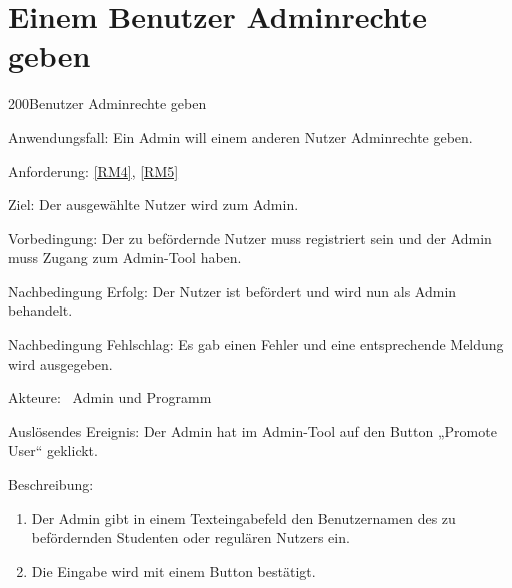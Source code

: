 \section{Einem Benutzer Adminrechte geben}
\begin{function}{200}{Benutzer Adminrechte geben}
\item[Anwendungsfall:] Ein Admin will einem anderen Nutzer Adminrechte geben.
\item[Anforderung:] \ref{RM4}, \ref{RM5}
\item[Ziel:] Der ausgewählte Nutzer wird zum Admin.
\item[Vorbedingung:] Der zu befördernde Nutzer muss registriert sein und der Admin muss Zugang zum Admin-Tool haben.
\item[Nachbedingung Erfolg:]  Der Nutzer ist befördert und wird nun als Admin behandelt.
\item[Nachbedingung Fehlschlag:] Es gab einen Fehler und eine entsprechende Meldung wird ausgegeben.
\item[Akteure:] ~Admin und Programm
\item[Auslösendes Ereignis:] Der Admin hat im Admin-Tool auf den Button „Promote User“ geklickt.
\item[Beschreibung:] ~
\begin{enumerate}
  \item  Der Admin gibt in einem Texteingabefeld den Benutzernamen des zu befördernden Studenten oder regulären Nutzers ein.
  \item  Die Eingabe wird mit einem Button bestätigt.
\end{enumerate}
\end{function}

